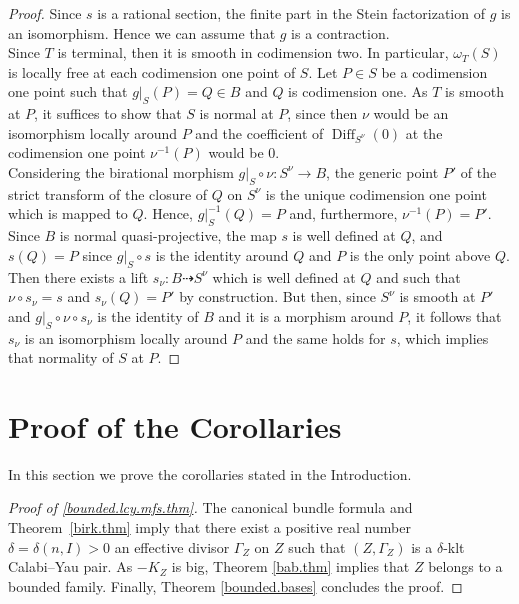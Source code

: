 \documentclass{amsart}[12pt,a4paper]
\theoremstyle{definition}
\DeclareMathOperator{\diff}{\mathrm{Diff}}
\begin{document}
\begin{proof}
Since $s$ is a rational section, the finite part in the Stein factorization of $g$ is an isomorphism.
Hence we can assume that $g$ is a contraction.\\
Since $T$ is terminal, then it is smooth in codimension two.
In particular, $\omega_T(S)$ is locally free at each codimension one point of $S$.
Let $P \in S$ be a codimension one point such that $g\vert_S(P)=Q \in B$ and $Q$ is codimension one. 
As $T$ is smooth at $P$, it suffices to show that $S$ is normal at $P$, since then $\nu$ would be an isomorphism locally around $P$ and the coefficient of $\diff_{S^\nu}(0)$ at the codimension one point $\nu^{-1}(P)$ would be $0$.
\\
Considering the birational morphism $g\vert_S \circ \nu \colon S^\nu \to B$, the generic point $P'$ of the strict transform of the closure of $Q$ on $S^\nu$ is the unique codimension one point which is mapped to $Q$. 
Hence, $g\vert_S^{-1}(Q)=P$ and, furthermore, $\nu^{-1}(P)=P'$.
Since $B$ is normal quasi-projective, the map $s$ is well defined at $Q$, and $s(Q)=P$ since $g\vert_S\circ s$ is the identity around $Q$ and $P$ is the only point above $Q$.
Then there exists a lift $s_\nu \colon B \dashrightarrow S^\nu$ which is well defined at $Q$ and such that $\nu \circ s_\nu=s$ and $s_\nu(Q)=P'$ by construction.
But then, since $S^\nu$ is smooth at $P'$ and $g\vert_S \circ \nu \circ s_\nu$ is the identity of $B$ and it is a morphism around $P$, it follows that $s_\nu$ is an isomorphism locally around $P$ and the same holds for $s$, which implies that normality of $S$ at $P$.
\end{proof}



\section{Proof of the Corollaries}
\label{sec.cor.proof}

In this section we prove the corollaries stated in the Introduction.

\begin{proof}[Proof of \ref{bounded.lcy.mfs.thm}]
The canonical bundle formula and Theorem~\ref{birk.thm} imply that there exist a positive real number $\delta=\delta(n, I) >0$ an effective divisor $\Gamma_Z$ on $Z$ such that $(Z, \Gamma_Z)$ is a $\delta$-klt Calabi--Yau pair.
As $-K_Z$ is big, Theorem \ref{bab.thm} implies that $Z$ belongs to a bounded family.
Finally, Theorem \ref{bounded.bases} concludes the proof.
\end{proof}
\end{document}
